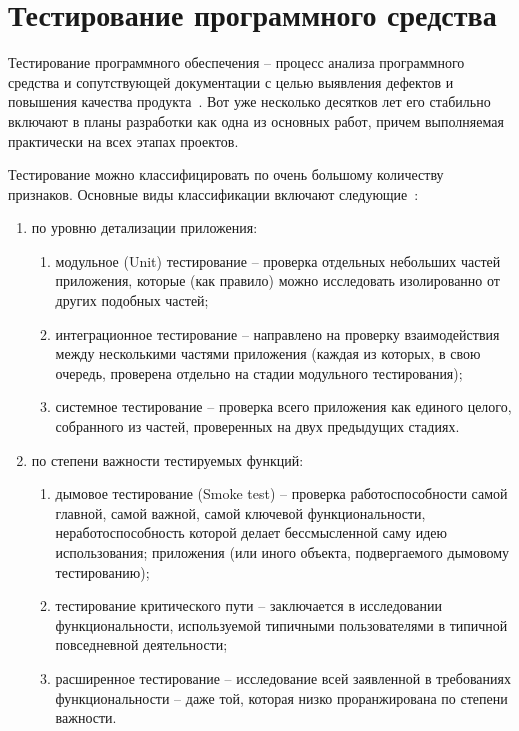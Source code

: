 \section{Тестирование программного средства}
\label{sec:testing}

Тестирование программного обеспечения -- процесс анализа программного средства и сопутствующей документации с целью выявления дефектов и повышения качества продукта~\cite{kulikov_testing}.
Вот уже несколько десятков лет его стабильно включают в планы разработки как одна из основных работ, причем выполняемая практически на всех этапах проектов.

Тестирование можно классифицировать по очень большому количеству признаков. Основные виды классификации включают следующие~\cite{kulikov_testing}:

\begin{enumerate}
    \item по уровню детализации приложения:
    \begin{enumerate}
        \item модульное (Unit) тестирование -- проверка отдельных небольших частей приложения, которые (как правило) можно исследовать изолированно от других подобных частей;
        \item интеграционное тестирование -- направлено на проверку взаимодействия между несколькими частями приложения (каждая из которых, в свою очередь, проверена отдельно на стадии модульного тестирования);
        \item системное тестирование -- проверка всего приложения как единого целого, собранного из частей, проверенных на двух предыдущих стадиях.
    \end{enumerate}
    \item по степени важности тестируемых функций:
    \begin{enumerate}
        \item дымовое тестирование (Smoke test) -- проверка работоспособности самой главной, самой важной, самой ключевой функциональности, неработоспособность которой делает бессмысленной саму идею использования; приложения (или иного объекта, подвергаемого дымовому тестированию);
        \item тестирование критического пути -- заключается в исследовании функциональности, используемой типичными пользователями в типичной повседневной деятельности;
        \item расширенное тестирование -- исследование всей заявленной в требованиях функциональности -- даже той, которая низко проранжирована по степени важности.
    \end{enumerate}
\end{enumerate}

